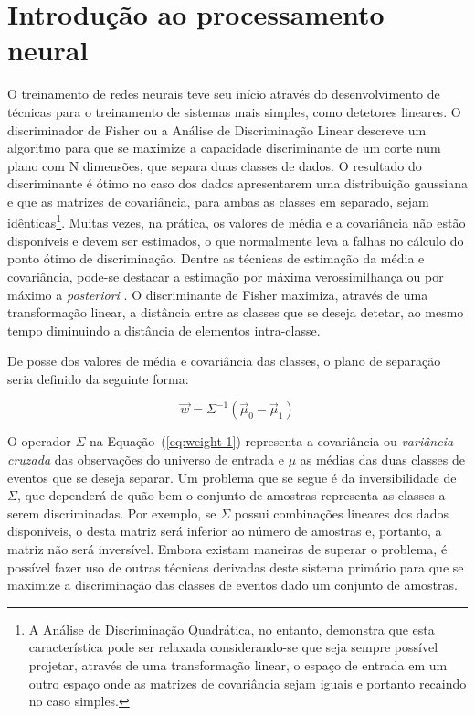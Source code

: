 \typeout{ ====================================================================}
\typeout{ ====================================================================}

\chapter{Introdução ao processamento neural}
\label{ap:rna}

O treinamento de redes neurais teve seu início através do desenvolvimento de
técnicas para o treinamento de sistemas mais simples, como detetores lineares.
O discriminador de Fisher \cite{fisher} ou a Análise de Discriminação Linear
descreve um algoritmo para que se maximize a capacidade discriminante de um
corte num plano com N dimensões, que separa duas classes de dados. O resultado
do discriminante é ótimo no caso dos dados apresentarem uma distribuição
gaussiana e que as matrizes de covariância, para ambas as classes em separado,
sejam idênticas\footnote{A Análise de Discriminação Quadrática, no entanto,
demonstra que esta característica pode ser relaxada considerando-se que seja
sempre possível projetar, através de uma transformação linear, o espaço de
entrada em um outro espaço onde as matrizes de covariância sejam iguais e
portanto recaindo no caso simples.}. Muitas vezes, na prática, os valores de
média e a covariância não estão disponíveis e devem ser estimados, o que
normalmente leva a falhas no cálculo do ponto ótimo de discriminação. Dentre
as técnicas de estimação da média e covariância, pode-se destacar a estimação
por máxima verossimilhança ou por máximo a \textit{posteriori} \cite{duda}. O
discriminante de Fisher maximiza, através de uma transformação linear, a
distância entre as classes que se deseja detetar, ao mesmo tempo diminuindo a
distância de elementos intra-classe.

De posse dos valores de média e covariância das classes, o plano de separação
seria definido da seguinte forma:

\begin{equation}
\overrightarrow{w} = \Sigma^{-1}(\overrightarrow{\mu}_0 -
\overrightarrow{\mu}_1) 
\label{eq:weight-1}
\end{equation}

O operador $\Sigma$ na Equação~(\ref{eq:weight-1}) representa a covariância ou
\textit{variância cruzada} das observações do universo de entrada e $\mu$ as
médias das duas classes de eventos que se deseja separar. Um problema que se
segue é da inversibilidade de $\Sigma$, que dependerá de quão bem o conjunto
de amostras representa as classes a serem discriminadas. Por exemplo, se
$\Sigma$ possui combinações lineares dos dados disponíveis, o  desta
matriz será inferior ao número de amostras e, portanto, a matriz não será
inversível. Embora existam maneiras de superar o problema, é possível fazer
uso de outras técnicas derivadas deste sistema primário para que se maximize a
discriminação das classes de eventos dado um conjunto de amostras.

